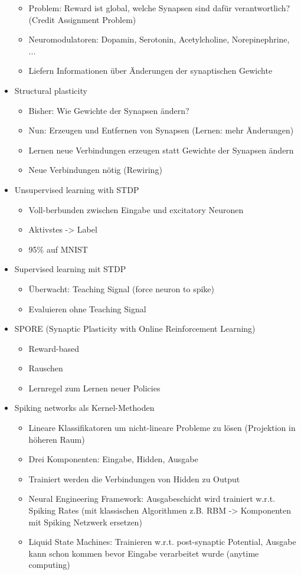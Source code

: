 \documentclass[paper=a4, fontsize=11pt]{scrartcl} %
\numberwithin{equation}{section} %
\numberwithin{figure}{section} %
\numberwithin{table}{section} %
\begin{document}
\begin{itemize}
\begin{itemize}
\item Problem: Reward ist global, welche Synapsen sind dafür verantwortlich? (Credit Assignment Problem)
\item Neuromodulatoren: Dopamin, Serotonin, Acetylcholine, Norepinephrine, ...
\item Liefern Informationen über Änderungen der synaptischen Gewichte
\end{itemize}
\item Structural plasticity
\begin{itemize}
\item Bisher: Wie Gewichte der Synapsen ändern?
\item Nun: Erzeugen und Entfernen von Synapsen (Lernen: mehr Änderungen)
\item Lernen neue Verbindungen erzeugen statt Gewichte der Synapsen ändern 
\item Neue Verbindungen nötig (Rewiring)
\end{itemize}
\item Unsupervised learning with STDP
\begin{itemize}
\item Voll-berbunden zwischen Eingabe und excitatory Neuronen
\item Aktivstes -> Label
\item 95\% auf MNIST
\end{itemize}
\item Supervised learning mit STDP
\begin{itemize}
\item Überwacht: Teaching Signal (force neuron to spike)
\item Evaluieren ohne Teaching Signal
\end{itemize}
\item SPORE (Synaptic Plasticity with Online Reinforcement Learning)
\begin{itemize}
\item Reward-based
\item Rauschen
\item Lernregel zum Lernen neuer Policies
\end{itemize}
\item Spiking networks als Kernel-Methoden
\begin{itemize}
\item Lineare Klassifikatoren um nicht-lineare Probleme zu lösen (Projektion in höheren Raum)
\item Drei Komponenten: Eingabe, Hidden, Ausgabe
\item Trainiert werden die Verbindungen von Hidden zu Output
\item Neural Engineering Framework: Ausgabeschicht wird trainiert w.r.t. Spiking Rates (mit klassischen Algorithmen z.B. RBM -> Komponenten mit Spiking Netzwerk ersetzen)
\item Liquid State Machines: Trainieren w.r.t. post-synaptic Potential, Ausgabe kann schon kommen bevor Eingabe verarbeitet wurde (anytime computing)
\end{itemize}
\end{itemize}
\end{document}
